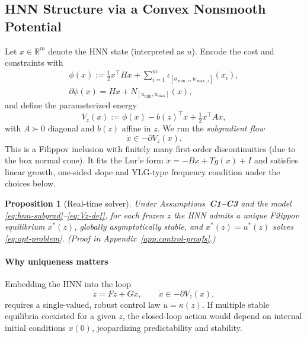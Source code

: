\documentclass[journal]{IEEEtran}
\newtheorem{proposition}{Proposition}
\begin{document}
\subsection{HNN Structure via a Convex Nonsmooth Potential}
Let \(x\in\mathbb{R}^m\) denote the HNN state (interpreted as \(u\)).
Encode the cost and constraints with
\begin{multline}\label{eq:phi-def}
  \phi(x):=\tfrac12 x^\top Hx + \sum_{i=1}^m \iota_{[u_{\min,i},u_{\max,i}]}(x_i),
  \\
  \partial\phi(x)=Hx + N_{[u_{\min},u_{\max}]}(x),
\end{multline}
and define the parameterized energy
\begin{equation}\label{eq:Vz-def}
  V_z(x):=\phi(x)-b(z)^\top x+\tfrac12 x^\top A x,
\end{equation}
with \(A\succ0\) diagonal and \(b(z)\) affine in \(z\).
We run the \emph{subgradient flow}
\begin{equation}\label{eq:hnn-subgrad}
  \dot x \in -\partial V_z(x).
\end{equation}
This is a Filippov inclusion with finitely many first-order discontinuities (due to the box normal cone). It fits the Lur’e form \(\dot x=-Bx+Tg(x)+I\) and satisfies linear growth, one-sided slope and YLG-type frequency condition under the choices below.

\begin{proposition}[Real-time solver]\label{prop:rt-solver}
Under Assumptions~\textbf{C1--C3} and the model \eqref{eq:hnn-subgrad}–\eqref{eq:Vz-def}, for each frozen \(z\) the HNN admits a unique Filippov equilibrium \(x^\ast(z)\), globally asymptotically stable, and \(x^\ast(z)=u^\ast(z)\) solves \eqref{eq:opt-problem}. \emph{(Proof in Appendix~\ref{app:control-proofs}.)}
\end{proposition}

\paragraph*{Why uniqueness matters}
Embedding the HNN into the loop
\begin{equation}\label{eq:closed-loop}
  \dot z = Fz + Gx, \qquad \dot x\in -\partial V_z(x),
\end{equation}
requires a single-valued, robust control law \(u=\kappa(z)\). If multiple stable equilibria coexisted for a given \(z\), the closed-loop action would depend on internal initial conditions \(x(0)\), jeopardizing predictability and stability.
\end{document}
